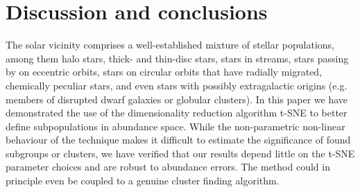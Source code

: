 \documentclass{aa}  %
\begin{document}
% 
% 
% 

\section{Discussion and conclusions}\label{conclusions}

The solar vicinity comprises a well-established mixture of stellar populations, among them halo stars, thick- and thin-disc stars, stars in streams, stars passing by on eccentric orbits, stars on circular orbits that have radially migrated, chemically peculiar stars, and even stars with possibly extragalactic origins (e.g. members of disrupted dwarf galaxies or globular clusters). 
In this paper we have demonstrated the use of the dimensionality reduction algorithm t-SNE to better define subpopulations in abundance space. While the non-parametric non-linear behaviour of the technique makes it difficult to estimate the significance of found subgroups or clusters, we have verified that our results depend little on the t-SNE parameter choices and are robust to abundance errors. The method could in principle even be coupled to a genuine cluster finding algorithm.
\end{document}
